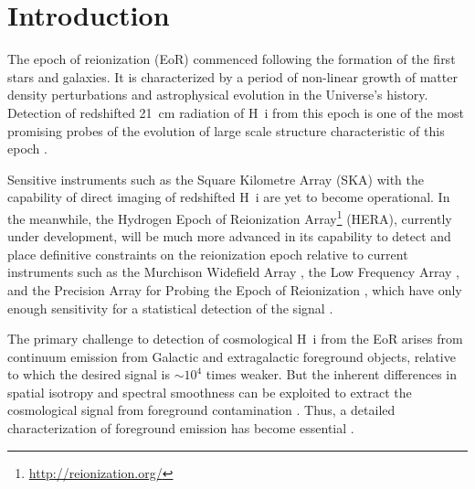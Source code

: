 \documentclass[preprint2,apjl,numberedappendix,twocolappendix,appendixfloats]{emulateapj}
\begin{document}

\section{Introduction}\label{sec:intro}

The epoch of reionization (EoR) commenced following the formation of the first stars and galaxies. It is characterized by a period of non-linear growth of matter density perturbations and astrophysical evolution in the Universe's history. Detection of redshifted 21~cm radiation of H~{\sc i} from this epoch is one of the most promising probes of the evolution of large scale structure characteristic of this epoch \citep{sun72,sco90,mad97,toz00,ili02}.

Sensitive instruments such as the Square Kilometre Array (SKA) with the capability of direct imaging of redshifted H~{\sc i} are yet to become operational. In the meanwhile, the Hydrogen Epoch of Reionization Array\footnote{\url{http://reionization.org/}} (HERA), currently under development, will be much more advanced in its capability to detect and place definitive constraints on the reionization epoch relative to current instruments such as the Murchison Widefield Array \citep[MWA;][]{lon09,tin13,bow13}, the Low Frequency Array \citep[LOFAR;][]{van13}, and the Precision Array for Probing the Epoch of Reionization \citep[PAPER;][]{par10}, which have only enough sensitivity for a statistical detection of the signal \citep{bow06,par12a,bea13,dil13,thy13,pob14}.


The primary challenge to detection of cosmological H~{\sc i} from the EoR arises from continuum emission from Galactic and extragalactic foreground objects, relative to which the desired signal is $\sim 10^4$ times weaker. But the inherent differences in spatial isotropy and spectral smoothness can be exploited to extract the cosmological signal from foreground contamination \citep[see, e.g.,][]{dim02,dim04,zal04,fur04,mor04,san05,fur06,mcq06,mor06,wan06,gle08}. Thus, a detailed characterization of foreground emission has become essential \citep{ali08,bow09,liu09,ber09,ber10,dat10,liu11,gho12,mor12,par12b,tro12,pob13,dil13,dil14,liu14a,liu14b,thy13,thy15}.
\end{document}
